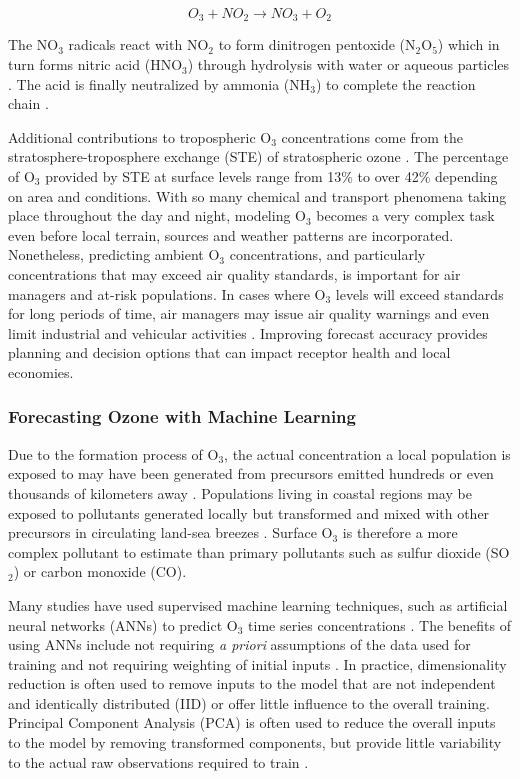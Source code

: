 \begin{equation}
\label{eq:nitrateformation}
O_{3} + NO_{2}\rightarrow NO_{3}+O_{2} 
\end{equation}

The NO$_{3}$ radicals react with NO$_{2}$ to form dinitrogen pentoxide (N$_{2}$O$_{5}$) which in turn forms nitric acid (HNO$_{3}$) through hydrolysis with water or aqueous particles \citep{Song2011}. The acid is finally neutralized by ammonia (NH$_{3}$) to complete the reaction chain \citep{Brown2012}.

Additional contributions to tropospheric O$_{3}$ concentrations come from the stratosphere-troposphere exchange (STE) of stratospheric ozone \citep{Tarasick2008}. The percentage of O$_{3}$ provided by STE at surface levels range from 13\% \citep{Cooper2006} to over 42\% \citep{Lelieveld2000} depending on area and conditions. With so many chemical and transport phenomena taking place throughout the day and night, modeling O$_{3}$ becomes a very complex task even before local terrain, sources and weather patterns are incorporated. Nonetheless, predicting ambient O$_{3}$ concentrations, and particularly concentrations that may exceed air quality standards, is important for air managers and at-risk populations.  In cases where O$_{3}$ levels will exceed standards for long periods of time, air managers may issue air quality warnings and even limit industrial and vehicular activities \citep{Kuhlbusch2014, Welch2005}. Improving forecast accuracy provides planning and decision options that can impact receptor health and local economies.

\subsubsection{Forecasting Ozone with Machine Learning}

Due to the formation process of O$_{3}$, the actual concentration a local population is exposed to may have been generated from precursors emitted hundreds or even thousands of kilometers away \citep{Glavas2011}. Populations living in coastal regions may be exposed to pollutants generated locally but transformed and mixed with other precursors in circulating land-sea breezes \citep{Freeman2017a}. Surface O$_{3}$ is therefore a more complex pollutant to estimate than primary pollutants such as sulfur dioxide (SO$_{2}$) or carbon monoxide (CO).

Many studies have used supervised machine learning techniques, such as artificial neural networks (ANNs) to predict O$_{3}$ time series concentrations \citep{Comrie1997, Dorling2003, Ettouney2009a, Kurt2008, Biancofiore2017}. The benefits of using ANNs include not requiring \textit{a priori} assumptions of the data used for training and not requiring weighting of initial inputs \citep{Gardner1998}. In practice, dimensionality reduction is often used to remove inputs to the model that are not independent and identically distributed (IID) or offer little influence to the overall training. Principal Component Analysis (PCA) is often used to reduce the overall inputs to the model by removing transformed components, but provide little variability to the actual raw observations required to train \citep{Singh2013, Wang2015a}.

